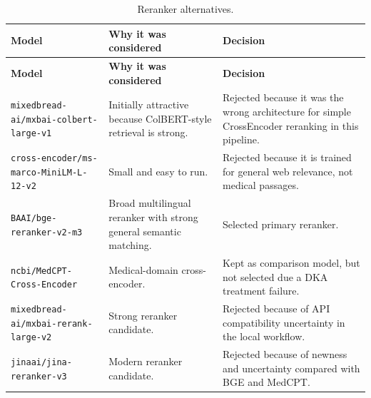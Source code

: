 \begin{longtable}{p{} p{} p{}}
\caption{Reranker alternatives.}
\label{tab:reranker_alternatives}\\
\toprule
\textbf{Model} & \textbf{Why it was considered} & \textbf{Decision}\\
\midrule
\endfirsthead
\toprule
\textbf{Model} & \textbf{Why it was considered} & \textbf{Decision}\\
\midrule
\endhead
\texttt{mixedbread-ai/mxbai-colbert-large-v1} & Initially attractive because ColBERT-style retrieval is strong. & Rejected because it was the wrong architecture for simple CrossEncoder reranking in this pipeline.\\
\texttt{cross-encoder/ms-marco-MiniLM-L-12-v2} & Small and easy to run. & Rejected because it is trained for general web relevance, not medical passages.\\
\texttt{BAAI/bge-reranker-v2-m3} & Broad multilingual reranker with strong general semantic matching. & Selected primary reranker.\\
\texttt{ncbi/MedCPT-Cross-Encoder} & Medical-domain cross-encoder. & Kept as comparison model, but not selected due a DKA treatment failure.\\
\texttt{mixedbread-ai/mxbai-rerank-large-v2} & Strong reranker candidate. & Rejected because of API compatibility uncertainty in the local workflow.\\
\texttt{jinaai/jina-reranker-v3} & Modern reranker candidate. & Rejected because of newness and uncertainty compared with BGE and MedCPT.\\
\bottomrule
\end{longtable}

